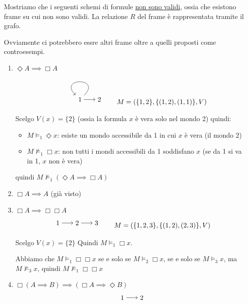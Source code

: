 \documentclass[../main.tex]{subfiles}
\begin{document}
\newpage
Mostriamo che i seguenti schemi di formule \underline{non sono validi}, ossia che esistono frame su cui non sono validi. La relazione $R$ del frame è rappresentata tramite il grafo.

Ovviamente ci potrebbero essre altri frame oltre a quelli proposti come controesempi.
\begin{enumerate}
    \item $\Diamond A \implies \Box A$
          \begin{equation*}
              \begin{tikzpicture}[->]
                  \node (1) {1};
                  \node (2) [right of=1] {2};
                  \path
                  (1) edge[loop] node {} (1)
                  (1) edge node {} (2);
              \end{tikzpicture}
              \qquad
              M = (\{1,2\},\{(1,2),(1,1)\}, V)
          \end{equation*}

          Scelgo $V(x) = \{2\} $ (ossia la formula $x$ è vera solo nel mondo 2) quindi:
          \begin{itemize}
              \item $M \vDash_1 \Diamond x$: esiste un mondo accessibile da 1 in cui $x$ è vera (il mondo 2)
              \item $M \nvDash_1 \Box x$: non tutti i mondi accessibili da 1 soddisfano $x$ (se da 1 si va in 1, $x$ non è vera)
          \end{itemize}
          quindi $M \nvDash_1 (\Diamond A \implies \Box A)$
    \item $\Box A \implies A$ (già visto)
    \item $\Box A \implies \Box \Box A$
          \begin{equation*}
              \begin{tikzpicture}[->]
                  \node (1) {1};
                  \node (2) [right of=1] {2};
                  \node (3) [right of=2] {3};
                  \path
                  (1) edge node {} (2)
                  (2) edge node {} (3);
              \end{tikzpicture}
              \qquad
              M = (\{1,2,3\},\{(1,2),(2,3)\}, V)
          \end{equation*}

          Scelgo $V(x) = \{2\}$ Quindi $M \vDash_1 \Box x$.

          Abbiamo che $M \vDash_1 \Box \Box x$ se e solo se $M \vDash_2 \Box x$, se e solo se $M \vDash_3 x$, ma $M \nvDash_3 x$, quindi $M \nvDash_1 \Box \Box x$
    \item $\Box (A \implies B) \implies (\Box A \implies \Diamond B)$
          \begin{equation*}
              \begin{tikzpicture}[->]
                  \node (1) {1};
                  \node (2) [right of=1] {2};
                  \path
                  (1) edge node {} (2);
              \end{tikzpicture}
          \end{equation*}


\end{enumerate}
\end{document}

